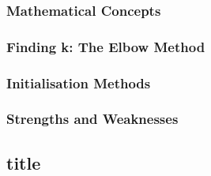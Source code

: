 \subsubsection*{Mathematical Concepts}
\subsubsection*{Finding k: The Elbow Method}
\subsubsection*{Initialisation Methods}
\subsubsection*{Strengths and Weaknesses}

\subsection*{title}
